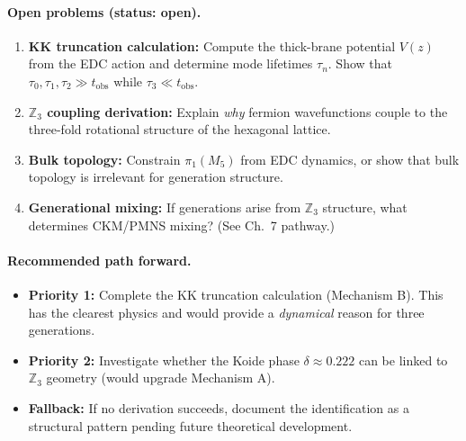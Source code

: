 \paragraph{Open problems (status: open).}
\begin{enumerate}
    \item \textbf{KK truncation calculation:} Compute the thick-brane potential
          $V(z)$ from the EDC action and determine mode lifetimes $\tau_n$.
          Show that $\tau_0, \tau_1, \tau_2 \gg t_{\text{obs}}$ while
          $\tau_3 \ll t_{\text{obs}}$.

    \item \textbf{$\mathbb{Z}_3$ coupling derivation:} Explain \emph{why}
          fermion wavefunctions couple to the three-fold rotational structure
          of the hexagonal lattice.

    \item \textbf{Bulk topology:} Constrain $\pi_1(M_5)$ from EDC dynamics,
          or show that bulk topology is irrelevant for generation structure.

    \item \textbf{Generational mixing:} If generations arise from $\mathbb{Z}_3$
          structure, what determines CKM/PMNS mixing? (See Ch.~7 pathway.)
\end{enumerate}

\paragraph{Recommended path forward.}
\begin{itemize}[nosep]
    \item \textbf{Priority 1:} Complete the KK truncation calculation (Mechanism B).
          This has the clearest physics and would provide a \emph{dynamical} reason
          for three generations.
    \item \textbf{Priority 2:} Investigate whether the Koide phase $\delta \approx 0.222$
          can be linked to $\mathbb{Z}_3$ geometry (would upgrade Mechanism A).
    \item \textbf{Fallback:} If no derivation succeeds, document the identification
          \tagI{} as a structural pattern pending future theoretical development.
\end{itemize}


